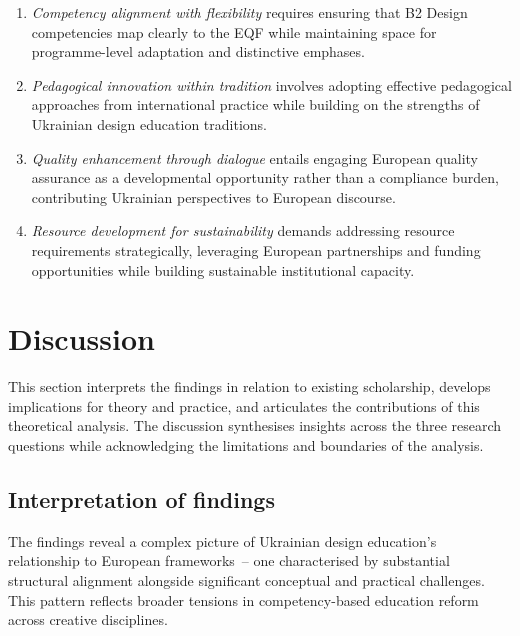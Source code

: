 \documentclass[ed]{acnsart}
\begin{document}
	\begin{enumerate}
		\item \textit{Competency alignment with flexibility} requires ensuring that B2 Design competencies map clearly to the EQF while maintaining space for programme-level adaptation and distinctive emphases.
		\item \textit{Pedagogical innovation within tradition} involves adopting effective pedagogical approaches from international practice while building on the strengths of Ukrainian design education traditions.
		\item \textit{Quality enhancement through dialogue} entails engaging European quality assurance as a developmental opportunity rather than a compliance burden, contributing Ukrainian perspectives to European discourse.
		\item \textit{Resource development for sustainability} demands addressing resource requirements strategically, leveraging European partnerships and funding opportunities while building sustainable institutional capacity.
	\end{enumerate}
	
	\section{Discussion}
	\label{sec:discussion}
	
	This section interprets the findings in relation to existing scholarship, develops implications for theory and practice, and articulates the contributions of this theoretical analysis. The discussion synthesises insights across the three research questions while acknowledging the limitations and boundaries of the analysis.
	
	\subsection{Interpretation of findings}
	
	The findings reveal a complex picture of Ukrainian design education's relationship to European frameworks~-- one characterised by substantial structural alignment alongside significant conceptual and practical challenges. This pattern reflects broader tensions in competency-based education reform across creative disciplines.
	
\end{document}
